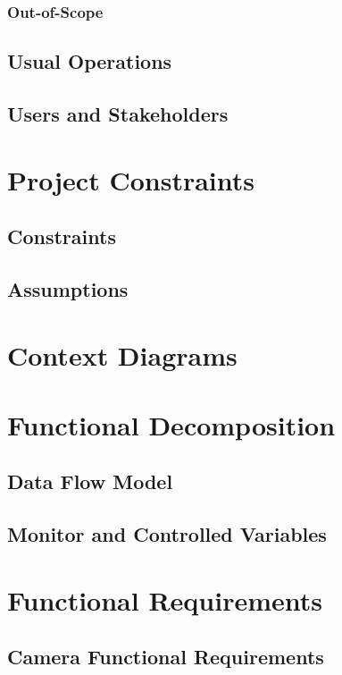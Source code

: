 \documentclass[12pt]{article}
\begin{document}
\subsubsection{Out-of-Scope}

\subsection{Usual Operations}

\subsection{Users and Stakeholders}

\section{Project Constraints}
\subsection{Constraints}

\subsection{Assumptions}

\section{Context Diagrams}

\section{Functional Decomposition}
\subsection{Data Flow Model}

\subsection{Monitor and Controlled Variables}

\section{Functional Requirements}
\subsection{Camera Functional Requirements}
\end{document}
